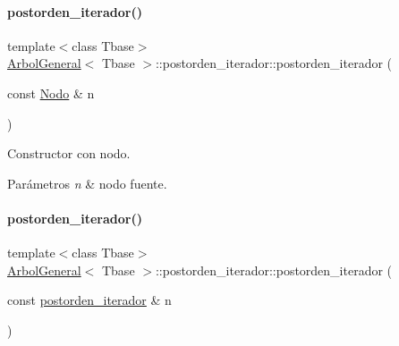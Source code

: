 \hypertarget{classArbolGeneral_1_1postorden__iterador_a40c1929529a5d1063e97c07a73ecb043}{}\label{classArbolGeneral_1_1postorden__iterador_a40c1929529a5d1063e97c07a73ecb043} 
\paragraph{\texorpdfstring{postorden\+\_\+iterador()}{postorden\_iterador()}\hspace{0.1cm}{\footnotesize\ttfamily [2/3]}}
{\footnotesize\ttfamily template$<$class Tbase$>$ \\
\hyperlink{classArbolGeneral}{Arbol\+General}$<$ Tbase $>$\+::postorden\+\_\+iterador\+::postorden\+\_\+iterador (\begin{DoxyParamCaption}\item[{const \hyperlink{classArbolGeneral_a12cc1b74a9095d89bc7334290d332f7a}{Nodo} \&}]{n }\end{DoxyParamCaption})\hspace{0.3cm}{\ttfamily [inline]}}



Constructor con nodo. 


\begin{DoxyParams}{Parámetros}
{\em n} & nodo fuente. \\
\hline
\end{DoxyParams}
\hypertarget{classArbolGeneral_1_1postorden__iterador_a07bc1d0276eb14be207144f0a69745d3}{}\label{classArbolGeneral_1_1postorden__iterador_a07bc1d0276eb14be207144f0a69745d3} 
\paragraph{\texorpdfstring{postorden\+\_\+iterador()}{postorden\_iterador()}\hspace{0.1cm}{\footnotesize\ttfamily [3/3]}}
{\footnotesize\ttfamily template$<$class Tbase$>$ \\
\hyperlink{classArbolGeneral}{Arbol\+General}$<$ Tbase $>$\+::postorden\+\_\+iterador\+::postorden\+\_\+iterador (\begin{DoxyParamCaption}\item[{const \hyperlink{classArbolGeneral_1_1postorden__iterador}{postorden\+\_\+iterador} \&}]{n }\end{DoxyParamCaption})\hspace{0.3cm}{\ttfamily [inline]}}



